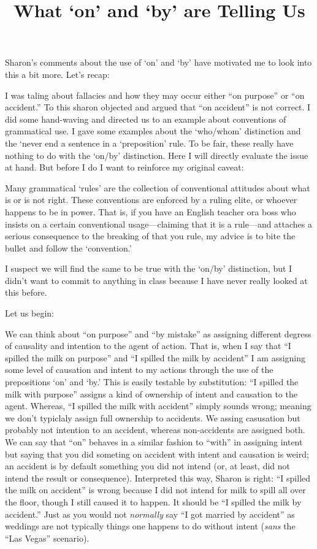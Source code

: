 \documentclass{wpblogentry}
\title{What `on' and `by' are Telling Us}
\begin{document}
Sharon's comments about the use of `on' and `by' have motivated me to look into this a bit more. Let's recap:

I was taling about fallacies and how they may occur either ``on purpose'' or ``on accident.'' To this sharon objected and argued that ``on accident'' is not correct. I did some hand-waving and directed us to an example about conventions of grammatical use. I gave some examples about the `who/whom' distinction and the `never end a sentence in a `preposition' rule. To be fair, these really have nothing to do with the `on/by' distinction. Here I will directly evaluate the issue at hand. But before I do I want to reinforce my original caveat:

Many grammatical `rules' are the collection of conventional attitudes about what is or is not right. These conventions are enforced by a ruling elite, or whoever happens to be in power. That is, if you have an English teacher ora boss who insists on a certain conventional usage---claiming that it is a rule---and attaches a serious consequence to the breaking of that you rule, my advice is to bite the bullet and follow the `convention.'

I suspect we will find the same to be true with the `on/by' distinction, but I didn't want to commit to anything in class because I have never really looked at this before.

Let us begin:

We can think about ``on purpose'' and ``by mistake'' as assigning different degress of causality and intention to the agent of action. That is, when I say that ``I spilled the milk on purpose'' and ``I spilled the milk by accident'' I am assigning some level of causation and intent to my actions through the use of the prepositions `on' and `by.' This is easily testable by substitution: ``I spilled the milk with purpose'' assigns a kind of ownership of intent and causation to the agent. Whereas, ``I spilled the milk with accident'' simply sounds wrong; meaning we don't typiclaly assign full ownership to accidents. We assing casusation but probably not intention to an accident, whereas non-accidents are assigned both. We can say that ``on'' behaves in a similar fashion to ``with'' in assigning intent but saying that you did someting on accident with intent and causation is weird; an accident is by default something you did not intend (or, at least, did not intend the result or consequence). Interpreted this way, Sharon is right: ``I spilled the milk on accident'' is wrong because I did not intend for milk to spill all over the floor, though I still caused it to happen. It should be ``I spilled the milk by accident.'' Just as you would not \emph{normally} say ``I got married by accident'' as weddings are not typically things one happens to do without intent (\emph{sans} the ``Las Vegas'' scenario).
\end{document}

